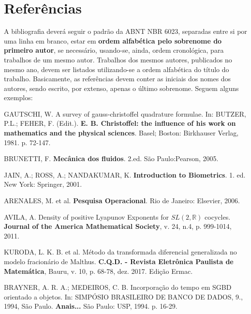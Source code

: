 \documentclass[a4paper,11pt]{article}
\begin{document}
{\section*{Referências}
{\color{red} A bibliografia deverá seguir o padrão da ABNT NBR 6023, separadas entre si por uma linha em branco, estar em \textbf{ordem alfabética pelo sobrenome do primeiro autor}, se necessário, usando-se, ainda, ordem cronológica, para trabalhos de um mesmo autor. Trabalhos dos mesmos autores, publicados no mesmo ano, devem ser listados utilizando-se a ordem alfabética do título do trabalho. Basicamente, as referências devem conter as iniciais dos nomes dos autores, sendo escrito, por extenso, apenas o último sobrenome. Seguem alguns exemplos:}


\begin{flushleft}


GAUTSCHI, W. A survey of gauss-christoffel quadrature formulae. In: BUTZER, P.L.; FEHER, F. (Edit.). {\bf E. B. Christoffel: the influence of his work on mathematics and the physical sciences}. Basel; Boston: Birkhauser Verlag, 1981. p. 72-147.

\vskip 0.2cm
BRUNETTI, F. \textbf{Mecânica dos fluidos}. 2.ed. São Paulo:Pearson, 2005.

\vskip 0.2cm
JAIN, A.; ROSS, A.; NANDAKUMAR, K. \textbf{Introduction to Biometrics}. 1. ed. New York: Springer, 2001.

\vskip 0.2cm


ARENALES, M. et al. \textbf{Pesquisa Operacional}. Rio de Janeiro: Elsevier, 2006.

\vskip 0.2cm


AVILA, A. Density of positive Lyapunov Exponents for $SL(2,\mathbb{R})$ cocycles. \textbf{Journal of the America Mathematical Society}, v. 24, n.4, p. 999-1014, 2011.

\vskip 0.2cm

KURODA, L. K. B. et al. Método da transformada diferencial generalizada no modelo fracionário de Malthus. \textbf{C.Q.D. - Revista Eletrônica Paulista de Matemática}, Bauru, v. 10, p. 68-78, dez. 2017. Edição Ermac. 

\vskip 0.2cm


BRAYNER, A. R. A.; MEDEIROS, C. B. Incorporação do tempo em SGBD orientado a objetos. In: SIMPÓSIO BRASILEIRO DE BANCO DE DADOS, 9., 1994, São Paulo. \textbf{Anais...} São Paulo: USP, 1994. p. 16-29.


\end{flushleft}}
\end{document}
